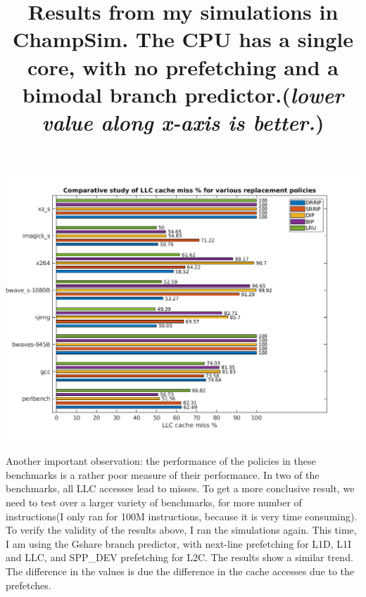 \documentclass[a4paper]{article}
\begin{document}
            \begin{center}
                \includegraphics[width=\linewidth]{images/shubhayu/LLC.png}
                \title{Results from my simulations in ChampSim. The CPU has a single core, with no prefetching and a bimodal branch predictor.(\textit{lower value along x-axis is better.})}
            \end{center}
            
            Another important observation: the performance of the policies in these benchmarks is a rather poor measure of their performance. In two of the benchmarks, all LLC accesses lead to misses. To get a more conclusive result, we need to test over a larger variety of benchmarks, for more number of instructions(I only ran for 100M instructions, because it is very time consuming).\\
            
            To verify the validity of the results above, I ran the simulations again. This time, I am using the Gshare branch predictor, with next-line prefetching for L1D, L1I and LLC, and SPP\_DEV prefetching for L2C. The results show a similar trend. The difference in the values is due the difference in the cache accesses due to the prefetches.
            
\end{document}
